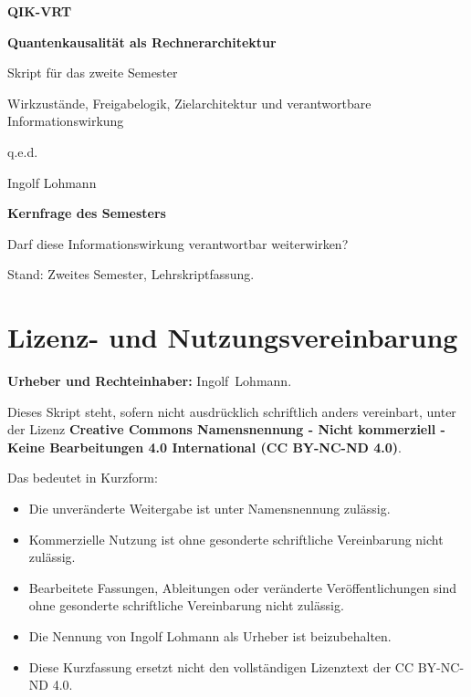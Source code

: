 \documentclass[11pt,a4paper,oneside]{book}
\begin{document}
\RaggedRight

\begin{titlepage}
\centering
\vspace*{20mm}
{\Huge\bfseries\color{qikblue} QIK-VRT\par}
\vspace{6mm}
{\LARGE\bfseries Quantenkausalität als Rechnerarchitektur\par}
\vspace{7mm}
{\Large Skript für das zweite Semester\par}
\vspace{5mm}
{\large Wirkzustände, Freigabelogik, Zielarchitektur und verantwortbare Informationswirkung\par}
\vfill
{\Large q.e.d.\par}
\vspace{3mm}
{\Large Ingolf Lohmann\par}
\vspace{16mm}
\begin{statusbox}
\centering
\textbf{Kernfrage des Semesters}\par\vspace{2mm}
Darf diese Informationswirkung verantwortbar weiterwirken?
\end{statusbox}
\vfill
{\small Stand: Zweites Semester, Lehrskriptfassung.}
\end{titlepage}

\frontmatter
\chapter*{Lizenz- und Nutzungsvereinbarung}

\textbf{Urheber und Rechteinhaber:} \mbox{Ingolf Lohmann}.

Dieses Skript steht, sofern nicht ausdrücklich schriftlich anders vereinbart, unter der Lizenz \textbf{Creative Commons Namensnennung - Nicht kommerziell - Keine Bearbeitungen 4.0 International (CC BY-NC-ND 4.0)}.

Das bedeutet in Kurzform:
\begin{itemize}
\item Die unveränderte Weitergabe ist unter Namensnennung zulässig.
\item Kommerzielle Nutzung ist ohne gesonderte schriftliche Vereinbarung nicht zulässig.
\item Bearbeitete Fassungen, Ableitungen oder veränderte Veröffentlichungen sind ohne gesonderte schriftliche Vereinbarung nicht zulässig.
\item Die Nennung von Ingolf Lohmann als Urheber ist beizubehalten.
\item Diese Kurzfassung ersetzt nicht den vollständigen Lizenztext der CC BY-NC-ND 4.0.
\end{itemize}
\end{document}

